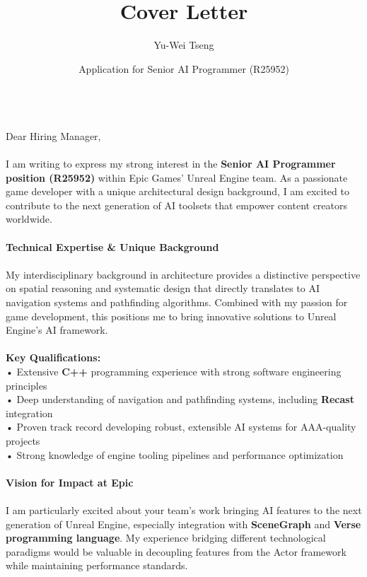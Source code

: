 \documentclass{article}
\title{Cover Letter}
\author{Yu-Wei Tseng}
\date{Application for Senior AI Programmer (R25952)}
\begin{document}
    \maketitle%
    \noindent
    \\
    Dear Hiring Manager,
    \\
    \\
    I am writing to express my strong interest in the \textbf{Senior AI Programmer position (R25952)} within Epic Games' Unreal Engine team. As a passionate game developer with a unique architectural design background, I am excited to contribute to the next generation of AI toolsets that empower content creators worldwide.
    \\
    \\
    \textbf{Technical Expertise \& Unique Background}
    \\
    \\
    My interdisciplinary background in architecture provides a distinctive perspective on spatial reasoning and systematic design that directly translates to AI navigation systems and pathfinding algorithms. Combined with my passion for game development, this positions me to bring innovative solutions to Unreal Engine's AI framework.
    \\
    \\
    \textbf{Key Qualifications:}
    \\
    • Extensive \textbf{C++} programming experience with strong software engineering principles\\
    • Deep understanding of navigation and pathfinding systems, including \textbf{Recast} integration\\
    • Proven track record developing robust, extensible AI systems for AAA-quality projects\\
    • Strong knowledge of engine tooling pipelines and performance optimization
    \\
    \\
    \textbf{Vision for Impact at Epic}
    \\
    \\
    I am particularly excited about your team's work bringing AI features to the next generation of Unreal Engine, especially integration with \textbf{SceneGraph} and \textbf{Verse programming language}. My experience bridging different technological paradigms would be valuable in decoupling features from the Actor framework while maintaining performance standards.
    \\
    \\
\end{document}
